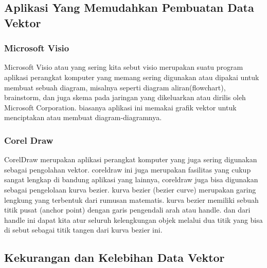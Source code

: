 \subsection {Aplikasi Yang Memudahkan Pembuatan Data Vektor}
\subsubsection {Microsoft Visio}
Microsoft Visio atau yang sering kita sebut visio merupakan suatu program aplikasi perangkat komputer yang memang sering digunakan atau dipakai untuk membuat sebuah diagram, misalnya seperti diagram aliran(flowchart), brainstorm, dan juga skema pada jaringan yang dikeluarkan atau dirilis oleh Microsoft Corporation. biasanya aplikasi ini memakai grafik vektor untuk menciptakan atau membuat diagram-diagramnya.
\subsubsection {Corel Draw}
CorelDraw merupakan aplikasi perangkat komputer yang juga sering digunakan sebagai pengolahan vektor. coreldraw ini juga merupakan fasilitas yang cukup sangat lengkap di bandung aplikasi yang lainnya, coreldraw juga bisa digunakan sebagai pengelolaan kurva bezier. kurva bezier (bezier curve) merupakan garing lengkung yang terbentuk dari rumusan matematis. 
kurva bezier memiliki sebuah titik pusat (anchor point) dengan garis pengendali arah atau handle. dan dari handle ini dapat kita atur seluruh kelengkungan objek melalui dua titik yang bisa di sebut sebagai titik tangen dari kurva bezier ini.

\subsection{Kekurangan dan Kelebihan Data Vektor}
